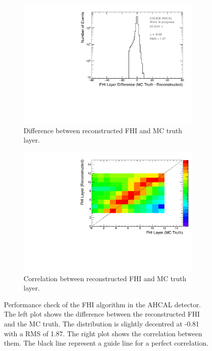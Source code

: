 \begin{figure}[htbp!]
	\begin{subfigure}[t]{0.5\textwidth}
		\centering
		\includegraphics[width=1\textwidth]{chap5/fig_AHCAL_timing/Pions/ShowerStart_Difference_noOptimisation.pdf}
		\caption{Difference between reconstructed FHI and MC truth layer.}\label{fig:Diff_FHI_RecoMC}
	\end{subfigure}
	\hfill
	\begin{subfigure}[t]{0.5\textwidth}
		\centering
		\includegraphics[width=1\textwidth]{chap5/fig_AHCAL_timing/Pions/ShowerStart_Difference_noOptimisation_2D.pdf}
		\caption{Correlation between reconstructed FHI and MC truth layer.}\label{fig:Corr_FHI_RecoMC}
	\end{subfigure}
	\caption{Performance check of the FHI algorithm in the AHCAL detector. The left plot shows the difference between the reconstructed FHI and the MC truth. The distribution is slightly decentred at -0.81 with a RMS of 1.87. The right plot shows the correlation between them. The black line represent a guide line for a perfect correlation.}
	\label{fig:FHIAlgo}
\end{figure}

